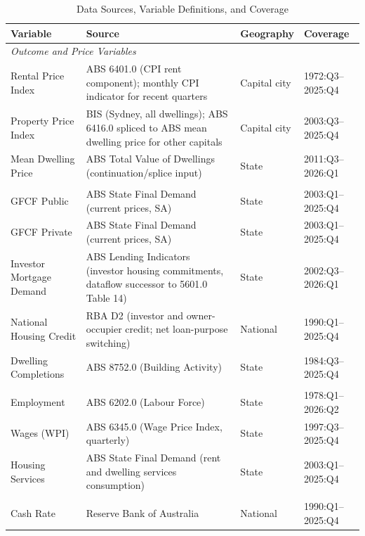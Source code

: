 \documentclass[preprint,11pt,authoryear]{elsarticle}
\begin{document}
\begin{appendices}
\begin{table}[!htbp]
\small
\centering
\caption{Data Sources, Variable Definitions, and Coverage}
\label{tab:data_sources}
\begin{threeparttable}
\begin{tabular*}{\textwidth}{@{}p{3.8cm}p{5.2cm}p{2.2cm}p{3.0cm}@{}}
\toprule
\textbf{Variable} & \textbf{Source} & \textbf{Geography} & \textbf{Coverage} \\
\midrule
\multicolumn{4}{l}{\textit{Outcome and Price Variables}} \\[3pt]
Rental Price Index & ABS 6401.0 (CPI rent component); monthly CPI indicator for recent quarters & Capital city & 1972:Q3--2025:Q4 \\
Property Price Index & BIS (Sydney, all dwellings); ABS 6416.0 spliced to ABS mean dwelling price for other capitals & Capital city & 2003:Q3--2025:Q4 \\
Mean Dwelling Price & ABS Total Value of Dwellings (continuation/splice input) & State & 2011:Q3--2026:Q1 \\
\addlinespace
\multicolumn{4}{l}{\textit{Construction and Investment}} \\[3pt]
GFCF Public & ABS State Final Demand (current prices, SA) & State & 2003:Q1--2025:Q4 \\
GFCF Private & ABS State Final Demand (current prices, SA) & State & 2003:Q1--2025:Q4 \\
Investor Mortgage Demand & ABS Lending Indicators (investor housing commitments, dataflow successor to 5601.0 Table 14) & State & 2002:Q3--2026:Q1 \\
National Housing Credit & RBA D2 (investor and owner-occupier credit; net loan-purpose switching) & National & 1990:Q1--2025:Q4 \\
Dwelling Completions & ABS 8752.0 (Building Activity) & State & 1984:Q3--2025:Q4 \\
\addlinespace
\multicolumn{4}{l}{\textit{Labour Market}} \\[3pt]
Employment & ABS 6202.0 (Labour Force) & State & 1978:Q1--2026:Q2 \\
Wages (WPI) & ABS 6345.0 (Wage Price Index, quarterly) & State & 1997:Q3--2025:Q4 \\
Housing Services & ABS State Final Demand (rent and dwelling services consumption) & State & 2003:Q1--2025:Q4 \\
\addlinespace
\multicolumn{4}{l}{\textit{Monetary Policy}} \\[3pt]
Cash Rate & Reserve Bank of Australia & National & 1990:Q1--2025:Q4 \\

\end{tabular*}
\end{threeparttable}
\end{table}
\end{appendices}
\end{document}
